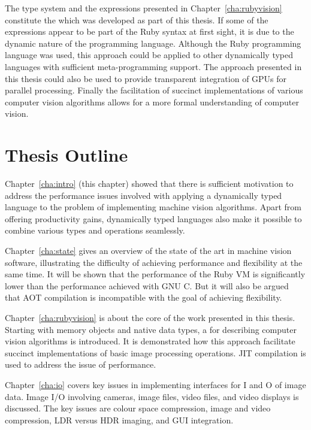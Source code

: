\documentclass[12pt,a4paper,oneside,openright]{book}
\newcommand{\cha}[1]{Chapter~\ref{cha:#1}}
\newcommand{\removed}[1]{\cbstart\removedfragile{#1}\cbend{}}
\newcommand{\removedfragile}[1]{{\color{red}{\sout{#1}}}{}}
\newcommand{\added}[1]{\cbstart\addedfragile{#1}\cbend{}}
\newcommand{\addedfragile}[1]{{\color{green!50!black}{\uline{#1}}}{}}
\newcommand{\removed}[1]{}
\newcommand{\removedfragile}[1]{}
\newcommand{\added}[1]{#1}
\newcommand{\addedfragile}[1]{#1}
\newcommand{\changed}[2]{\removed{#1}\added{#2}}
\begin{document}
\begin{CJK}{UTF8}{}
The type system and the expressions presented in \cha{rubyvision} constitute the \changed{DSL}{library} which was developed as part of this thesis. If some of the expressions appear to be part of the Ruby syntax at first sight, it is due to the dynamic nature of the programming language. Although the Ruby programming language was used, this approach could be applied to other dynamically typed languages with sufficient meta-programming support. The approach presented in this thesis could also be used to provide transparent integration of \acp{GPU} for parallel processing. Finally the facilitation of succinct implementations of various computer vision algorithms allows for a more formal understanding of computer vision.

\section{Thesis Outline}\label{cha:outline}
\cha{intro} (this chapter) showed that there is sufficient motivation to address the performance issues involved with applying a dynamically typed language to the problem of implementing machine vision algorithms. Apart from offering productivity gains, dynamically typed languages also make it possible to combine various types and operations seamlessly.

\cha{state} gives an overview of the state of the art in machine vision software, illustrating the difficulty of achieving performance and flexibility at the same time. It will be shown that the performance of the Ruby \ac{VM} is significantly lower than the performance achieved with \acs{GNU} C. But it will also be argued that \ac{AOT} compilation is incompatible with the goal of achieving flexibility.

\cha{rubyvision} is about the core of the work presented in this thesis. Starting with memory objects and native data types, a \changed{DSL}{library} for describing computer vision algorithms is introduced. It is demonstrated how this approach facilitate succinct implementations of basic image processing operations. \ac{JIT} compilation is used to address the issue of performance.

\cha{io} covers key issues in implementing interfaces for \acl{I} and \acl{O} of image data. Image \ac{I}/\ac{O} involving cameras, image files, video files, and video displays is discussed. The key issues are colour space compression, image and video compression, \ac{LDR} versus \ac{HDR} imaging, and \ac{GUI} integration.


\end{CJK}
\end{document}
